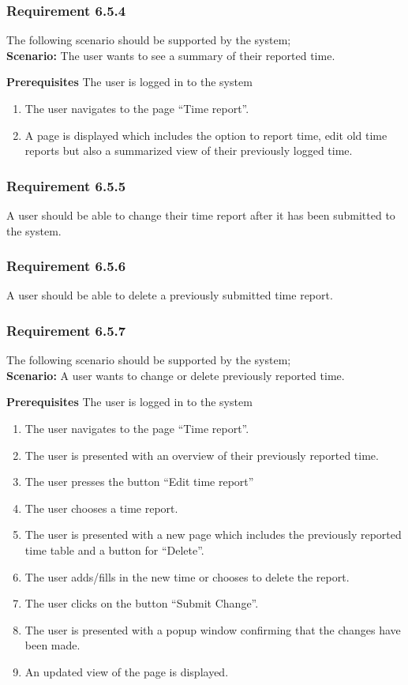 \documentclass{article}
\begin{document}
\subsubsection{Requirement 6.5.4}
The following scenario should be supported by the system;\\

\textbf{Scenario:} The user wants to see a summary of their reported time.

\textbf{Prerequisites} The user is logged in to the system
\begin{enumerate}


\item The user navigates to the page “Time report”.
\item A page is displayed which includes the option to report time, edit old time reports but also a summarized view of their previously logged time. 
\end{enumerate}

\subsubsection{Requirement 6.5.5}
A user should be able to change their time report after it has been submitted to the system.
\subsubsection{Requirement 6.5.6}
A user should be able to delete a previously submitted time report.
\subsubsection{Requirement 6.5.7}
The following scenario should be supported by the system;\\

\textbf{Scenario:} A user wants to change or delete previously reported time.

\textbf{Prerequisites} The user is logged in to the system

\begin{enumerate}

\item The user navigates to the page “Time report”.
\item The user is presented with an overview of their previously reported time. 
\item The user presses the button “Edit time report”
\item The user chooses a time report.
\item The user is presented with a new page which includes the previously reported time table and a button for “Delete”. 
\item The user adds/fills in the new time or chooses to delete the report.
\item The user clicks on the button “Submit Change”.
\item The user is presented with a popup window confirming that the changes have been made.  
\item An updated view of the page is displayed.

\end{enumerate}
\end{document}
